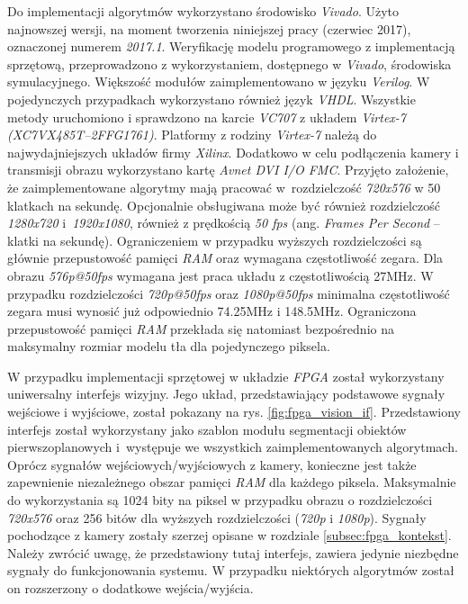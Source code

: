Do implementacji algorytmów wykorzystano środowisko \textit{Vivado}. 
Użyto najnowszej wersji, na moment tworzenia niniejszej pracy (czerwiec 2017), oznaczonej numerem \textit{2017.1}. Weryfikację modelu programowego z implementacją sprzętową, przeprowadzono z wykorzystaniem, dostępnego w \textit{Vivado}, środowiska symulacyjnego.
Większość modułów zaimplementowano w języku \textit{Verilog}. 
W pojedynczych przypadkach wykorzystano również język \textit{VHDL}. 
Wszystkie metody uruchomiono i sprawdzono na karcie \textit{VC707} z układem \textit{Virtex-7 (\small{XC7VX485T--2FFG1761})}. 
Platformy z rodziny \textit{Virtex-7} należą do najwydajniejszych układów firmy \textit{Xilinx}. 
Dodatkowo w celu podłączenia kamery i transmisji obrazu wykorzystano kartę \textit{Avnet DVI I/O FMC}. 
Przyjęto założenie, że zaimplementowane algorytmy mają pracować w~rozdzielczość \textit{720x576} w 50 klatkach na sekundę. Opcjonalnie obsługiwana może być również rozdzielczość \textit{1280x720} i~\textit{1920x1080}, również z prędkością \textit{50 fps} (ang. \textit{Frames Per Second} -- klatki na sekundę). Ograniczeniem w przypadku wyższych rozdzielczości są głównie przepustowość pamięci \textit{RAM} oraz wymagana częstotliwość zegara. Dla obrazu \textit{576p@50fps} wymagana jest praca układu z częstotliwością \num{27}MHz. W przypadku rozdzielczości \textit{720p@50fps} oraz \textit{1080p@50fps} minimalna częstotliwość zegara musi wynosić już odpowiednio \num{74.25}MHz i \num{148.5}MHz. 
Ograniczona przepustowość pamięci \textit{RAM} przekłada się natomiast bezpośrednio na maksymalny rozmiar modelu tła dla pojedynczego piksela.


W przypadku implementacji sprzętowej w układzie \textit{FPGA} został wykorzystany uniwersalny interfejs wizyjny. 
Jego układ, przedstawiający podstawowe sygnały wejściowe i wyjściowe, został pokazany na rys. \ref{fig:fpga_vision_if}. Przedstawiony interfejs został wykorzystany jako szablon modułu segmentacji obiektów pierwszoplanowych i~występuje we wszystkich zaimplementowanych algorytmach. 
Oprócz sygnałów wejściowych/wyjściowych z kamery, konieczne jest także zapewnienie niezależnego obszar pamięci \textit{RAM} dla każdego piksela.
Maksymalnie do wykorzystania są 1024 bity na piksel w przypadku obrazu o rozdzielczości \textit{720x576} oraz 256 bitów dla wyższych rozdzielczości (\textit{720p} i \textit{1080p}). 
Sygnały pochodzące z kamery zostały szerzej opisane w rozdziale \ref{subsec:fpga_kontekst}. 
Należy zwrócić uwagę, że przedstawiony tutaj interfejs, zawiera jedynie niezbędne sygnały do funkcjonowania systemu. 
W przypadku niektórych algorytmów został on rozszerzony o dodatkowe wejścia/wyjścia. 

